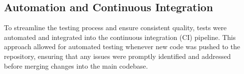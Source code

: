 \subsection{Automation and Continuous Integration}

To streamline the testing process and ensure consistent quality, tests were automated and integrated into the continuous integration (CI) pipeline. This approach allowed for automated testing whenever new code was pushed to the repository, ensuring that any issues were promptly identified and addressed before merging changes into the main codebase.


